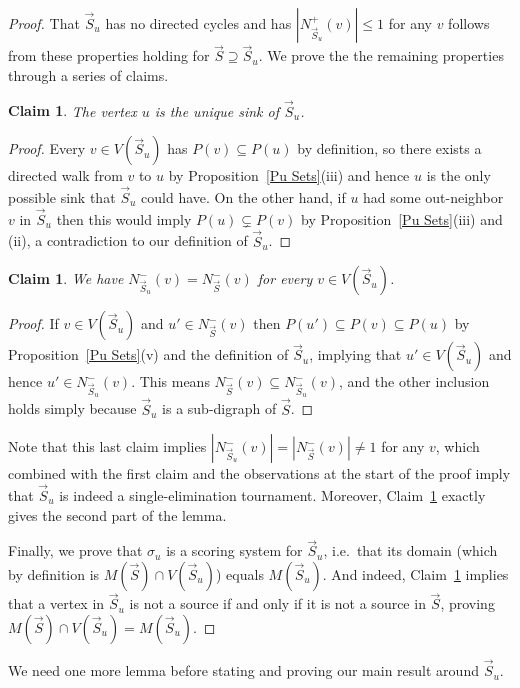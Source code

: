 \documentclass[12pt,letterpaper]{article}
\newtheorem{claim}[thm]{Claim}
\theoremstyle{definition}
\newcommand{\sig}{\sigma}
\renewcommand{\1}{\mathbbm{1}}
\newcommand{\sub}{\subseteq}
\newcommand{\tour}{\vec{S}}
\begin{document}
\begin{proof}
	That $\tour_u$ has no directed cycles and has $|N^+_{\tour_u}(v)|\le 1$ for any $v$ follows from these properties holding for $\tour\supseteq \tour_u$.   We prove the the remaining properties through a series of claims.
	\begin{claim}
		The vertex $u$ is the unique sink of $\tour_u$.
	\end{claim}
	\begin{proof}
		Every $v\in V(\tour_u)$ has $P(v)\sub P(u)$ by definition, so there exists a directed walk from $v$ to $u$ by Proposition~\ref{Pu Sets}(iii) and hence $u$ is the only possible sink that $\tour_u$ could have.  On the other hand, if $u$ had some out-neighbor $v$ in $\tour_u$ then this would imply $P(u)\subsetneq P(v)$ by Proposition~\ref{Pu Sets}(iii) and (ii), a contradiction to our definition of $\tour_u$.
	\end{proof}
	\begin{claim}\label{Claim tour_u}
		We have $N^-_{\tour_u}(v)=N^-_{\tour}(v)$ for every $v\in V(\tour_u)$.
	\end{claim}
	\begin{proof}
		If $v\in V(\tour_u)$ and $u'\in N^-_{\tour}(v)$ then $P(u')\sub P(v)\sub P(u)$ by Proposition~\ref{Pu Sets}(v) and the definition of $\tour_u$, implying that $u'\in V(\tour_u)$ and hence $u'\in N^-_{\tour_u}(v)$.  This means $N^-_{\tour}(v)\sub N^-_{\tour_u}(v)$, and the other inclusion holds simply because $\tour_u$ is a sub-digraph of $\tour$. 
	\end{proof}
	Note that this last claim implies $|N^-_{\tour_u}(v)|=|N^-_{\tour}(v)|\ne 1$ for any $v$, which combined with the first claim and the observations at the start of the proof imply that $\tour_u$ is indeed a single-elimination tournament.  Moreover, Claim~\ref{Claim tour_u} exactly gives the second part of the lemma.
	
	Finally, we prove that $\sig_u$ is a scoring system for $\tour_u$, i.e.\ that its domain (which by definition is $M(\tour)\cap V(\tour_u)$) equals $M(\tour_u)$.  And indeed, Claim~\ref{Claim tour_u} implies that a vertex in $\tour_u$ is not a source if and only if it is not a source in $\tour$, proving $M(\tour)\cap V(\tour_u)=M(\tour_u)$.
\end{proof}
We need one more lemma before stating and proving our main result around $\tour_u$.
\end{document}

